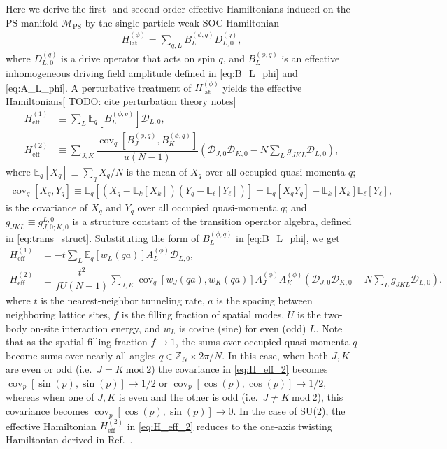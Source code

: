 \documentclass[nofootinbib,notitlepage,11pt]{revtex4-2}
\renewcommand{\t}{\text} %
\newcommand{\f}[2]{\dfrac{#1}{#2}} %
\newcommand{\p}[1]{\left(#1\right)} %
\renewcommand{\sp}[1]{\left[#1\right]} %
\newcommand{\1}{\mathds{1}}
\newcommand{\D}{\mathcal{D}}
\newcommand{\M}{\mathcal{M}}
\newcommand{\EE}{\mathbb{E}}
\newcommand{\ZZ}{\mathbb{Z}}
\newcommand{\PS}{\text{PS}}
\DeclareMathOperator{\cov}{cov}
\newcommand{\red}[1]{{\color{red} #1}}
\begin{document}
Here we derive the first- and second-order effective Hamiltonians
induced on the PS manifold $\M_\PS$ by the single-particle weak-SOC
Hamiltonian
\begin{align}
  H_{\t{lat}}^{(\phi)}
  = \sum_{q,L} B_L^{(\phi,q)} D_{L,0}^{(q)},
\end{align}
where $D_{L,0}^{(q)}$ is a drive operator that acts on spin $q$, and
$B_L^{(\phi,q)}$ is an effective inhomogeneous driving field amplitude
defined in \eqref{eq:B_L_phi} and \eqref{eq:A_L_phi}.  A perturbative
treatment of $H_{\t{lat}}^{(\phi)}$ yields the effective
Hamiltonians[\red{TODO: cite perturbation theory notes}]
\begin{align}
  H_{\t{eff}}^{(1)}
  &\equiv \sum_L \EE_q\sp{B_L^{(\phi,q)}} \D_{L,0},
  \\
  H_{\t{eff}}^{(2)}
  &\equiv \sum_{J,K}
  \f{\cov_q\sp{B_J^{(\phi,q)}, B_K^{(\phi,q)}}}{u\p{N-1}}
  \p{\D_{J,0} \D_{K,0} - N \sum_L g_{JKL} \D_{L,0}},
\end{align}
where $\EE_q\sp{X_q} \equiv \sum_q X_q / N$ is the mean of $X_q$ over
all occupied quasi-momenta $q$;
\begin{align}
  \cov_q\sp{X_q,Y_q}
  \equiv \EE_q\sp{\p{X_q-\EE_k\sp{X_k}}\p{Y_q-\EE_\ell\sp{Y_\ell}}}
  = \EE_q\sp{X_q Y_q} - \EE_k\sp{X_k} \EE_\ell\sp{Y_\ell},
  \label{eq:cov}
\end{align}
is the covariance of $X_q$ and $Y_q$ over all occupied quasi-momenta
$q$; and $g_{JKL} \equiv g_{J,0;K,0}^{L,0}$ is a structure constant of
the transition operator algebra, defined in \eqref{eq:trans_struct}.
Substituting the form of $B_L^{(\phi,q)}$ in \eqref{eq:B_L_phi}, we
get
\begin{align}
  H_{\t{eff}}^{(1)}
  &= -t \sum_L \EE_q\sp{w_L\p{qa}} A_L^{(\phi)} \D_{L,0},
  \label{eq:H_eff_1}
  \\
  H_{\t{eff}}^{(2)}
  &\equiv \f{t^2}{fU\p{N-1}} \sum_{J,K}
  \cov_q\sp{w_J\p{qa}, w_K\p{qa}} A_J^{(\phi)} A_K^{(\phi)}
  \p{\D_{J,0} \D_{K,0} - N \sum_L g_{JKL} \D_{L,0}}.
  \label{eq:H_eff_2}
\end{align}
where $t$ is the nearest-neighbor tunneling rate, $a$ is the spacing
between neighboring lattice sites, $f$ is the filling fraction of
spatial modes, $U$ is the two-body on-site interaction energy, and
$w_L$ is cosine (sine) for even (odd) $L$.  Note that as the spatial
filling fraction $f\to1$, the sums over occupied quasi-momenta $q$
become sums over nearly all angles $q\in\ZZ_N\times2\pi/N$.  In this
case, when both $J,K$ are even or odd (i.e.~$J=K~\t{mod}~2$) the
covariance in \eqref{eq:H_eff_2} becomes
$\cov_p\sp{\sin\p{p},\sin\p{p}}\to1/2$ or
$\cov_p\sp{\cos\p{p},\cos\p{p}}\to1/2$, whereas when one of $J,K$ is
even and the other is odd (i.e.~$J\ne K~\t{mod}~2$), this covariance
becomes $\cov_p\sp{\cos\p{p},\sin\p{p}}\to0$.  In the case of SU(2),
the effective Hamiltonian $H_{\t{eff}}^{(2)}$ in \eqref{eq:H_eff_2}
reduces to the one-axis twisting Hamiltonian derived in
Ref.~\cite{he2019engineering}.
\end{document}
